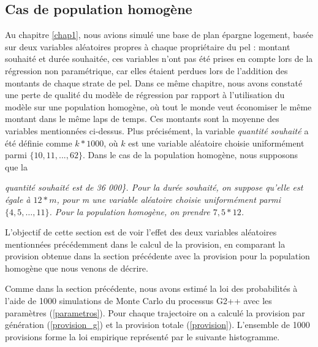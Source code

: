 \documentclass[12pt, a4paper]{book}
\begin{document}
\subsection{Cas de population homogène}
Au chapitre \ref{chap1}, nous avions simulé une base de plan épargne logement, basée sur deux variables aléatoires propres à chaque propriétaire du pel : montant souhaité et durée souhaitée, ces variables n'ont pas été prises en compte lors de la régression non paramétrique, car elles étaient perdues lors de l'addition des montants de chaque strate de pel. Dans ce même chapitre, nous avons constaté une perte de qualité du modèle de régression par rapport à l'utilisation du modèle sur une population homogène, où tout le monde veut économiser le même montant dans le même laps de temps. Ces montants sont la moyenne des variables mentionnées ci-dessus. Plus précisément, la variable {\it quantité souhaité} a été définie comme $k*1000$, où $k$ est une variable aléatoire choisie uniformément parmi $\{10,11,...,62\}$. Dans le cas de la population homogène, nous supposons que la {\it quantité souhaité est de 36 000\}. Pour la durée souhaité, on suppose qu'elle est égale à $12 * m$, pour m une variable aléatoire choisie uniformément parmi $\{4, 5,\ldots, 11\}$. Pour la population homogène,  on prendre $7,5 * 12$.

L'objectif de cette section est de voir l'effet des deux variables aléatoires mentionnées précédemment dans le calcul de la provision, en comparant la provision obtenue dans la section précédente avec la provision pour la population homogène que nous venons de décrire.


Comme dans la section précédente, nous avons estimé la loi des probabilités à l'aide de 1000 simulations de Monte Carlo du processus G2++ avec les paramètres (\ref{parametros}). Pour chaque trajectoire on a calculé la provision par génération (\ref{provision_g}) et la provision totale (\ref{provision}). L'ensemble de 1000 provisions forme la loi empirique représenté par le suivante histogramme.  

}
\end{document}
